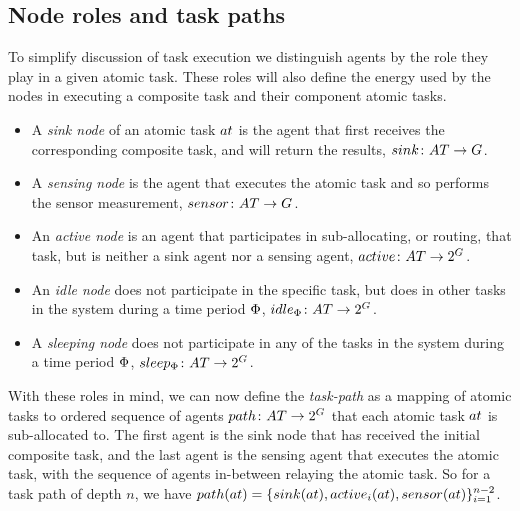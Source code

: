 \subsection{Node roles and task paths}
\label{section:roles}

\newcommand{\formalSinkRole}[2]{
	\functionFormal{sink}
	{\setAtomicTask{}{}}
	{\setAgents{}{}}
}
\newcommand{\formalSenseRole}[2]{
	\functionFormal{sensor}
	{\setAtomicTask{}{}}
	{\setAgents{}{}}
}
\newcommand{\formalActiveRole}[2]{
	\functionFormal{active}
	{\setAtomicTask{}{}}
	{\powerSetAgents{}{}}
}
\newcommand{\formalIdleRole}[2]{
	\functionFormal{idle_{\setTime{}{}}}
	{\setAtomicTask{}{}}
	{\powerSetAgents{}{}}
}
\newcommand{\formalSleepRole}[2]{
	\functionFormal{sleep_{\setTime{}{}}}
	{\setAtomicTask{}{}}
	{\powerSetAgents{}{}}
}
\newcommand{\functionSinkRole}[2]{\functionSignature{sink}{\varAtomicTask{}{}}}
	
\newcommand{\functionSenseRole}[2]{\functionSignature{sensor}{\varAtomicTask{}{}}}
\newcommand{\functionActiveRole}[2]{\functionSignature{active_{#1}}{\varAtomicTask{}{}}}
\newcommand{\functionIdleRole}[2]{\functionSignature{idle}{\varAtomicTask{}{}}}
\newcommand{\functionSleepRole}[2]{\functionSignature{sleep}{\varAtomicTask{}{}}}

To simplify discussion of task execution we distinguish agents by the role they play in a given atomic task. These roles will also define the energy used by the nodes in executing a composite task and their component atomic tasks.
\begin{itemize}
	\item A \textit{sink node} of an atomic task $\varAtomicTask{}{}$ is the agent that first receives the corresponding composite task, and will return the results, $\formalSinkRole{}{}$.
	\item A \textit{sensing node} is the agent that executes the atomic task and so performs the sensor measurement, $\formalSenseRole{}{}$.
	\item An \textit{active node} is an agent that participates in sub-allocating, or routing, that task, but is neither a sink agent nor a sensing agent, $\formalActiveRole{}{}$.
	\item An \textit{idle node} does not participate in the specific task, but does in other tasks in the system during a time period $\Phi$, $\formalIdleRole{}{}$.
	\item A \textit{sleeping node} does not participate in any of the tasks in the system during a time period $\Phi$, $\formalSleepRole{}{}$.
\end{itemize}
With these roles in mind, we can now define the  \textit{task-path} as a mapping of atomic tasks to ordered sequence of agents $\formalTaskArc{}{}$ that each atomic task $\varAtomicTask{}{}$ is sub-allocated to. The first agent is the sink node that has received the initial composite task, and the last agent is the sensing agent that executes the atomic task, with the sequence of agents in-between relaying the atomic task. So for a task path of depth $n$, we have
$\functionTaskArc{}{} = \lbrace \functionSinkRole{}{}, \functionActiveRole{i}{}, \functionSenseRole{}{} \rbrace_{i=1}^{n-2}$. 
